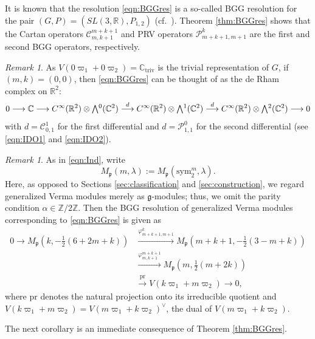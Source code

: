 \documentclass[reqno,11pt]{amsart}
\theoremstyle{remark}
\newtheorem{rem}[equation]{Remark}
\numberwithin{equation}{section}
\newcommand{\ga}{\alpha}
\newcommand{\fg}{{\mathfrak g}}
\newcommand{\fp}{{\mathfrak p}}
\newcommand{\R}{\mathbb{R}}
\newcommand{\C}{\mathbb{C}}
\newcommand{\Z}{\mathbb{Z}}
\newcommand{\Cal}{\mathcal}
\newcommand{\To}{\longrightarrow}
\newcommand{\triv}{\mathrm{triv}}
\newcommand{\sym}{\mathrm{sym}}
\newcommand{\pr}{\mathrm{pr}}
\newcommand{\Exterior}{\mathchoice{{\textstyle\bigwedge}}%
    {{\bigwedge}}%
    {{\textstyle\wedge}}%
    {{\scriptstyle\wedge}}}
\begin{document}
It is known that the resolution \eqref{eqn:BGGres} is a so-called
BGG resolution for the pair
$(G, P)= (SL(3,\R), P_{1,2})$ (cf.\  \cite{CD01, CSS01, EG11}).
Theorem \ref{thm:BGGres} shows that the Cartan operators
$\Cal{C}^{m+k+1}_{m,k+1}$ and PRV operators 
$\Cal{P}^{k}_{m+k+1,m+1}$ 
are the first and second BGG operators, respectively.

\begin{rem}
As $V(0\varpi_1 + 0\varpi_2)=\C_{\triv}$ is the trivial
representation of $G$, 
if $(m,k)=(0,0)$, then
\eqref{eqn:BGGres} can be thought of as
the de Rham complex on $\R^2$: 
\begin{equation*}%
0\To
\C
\To
C^\infty(\R^2) \otimes \Exterior^0(\C^2)
\stackrel{d}{\To}
C^\infty(\R^2)\otimes \Exterior^1(\C^2)
\stackrel{d}{\To}
C^\infty(\R^2)\otimes \Exterior^2(\C^2)
\To 0
\end{equation*}
with $d=\Cal{C}^{1}_{0,1}$ for the first differential 
and $d=\Cal{P}^{0}_{1,1}$ for the second differential 
(see \eqref{eqn:IDO1} and \eqref{eqn:IDO2}).
\end{rem}

\begin{rem}
As in \eqref{eqn:Ind}, write
\begin{equation*}
M_\fp(m,\lambda):=M_\fp(\sym^m_2,\lambda).
\end{equation*}
Here, as opposed to Sections \ref{sec:classification} and \ref{sec:construction}, 
we regard generalized Verma modules merely as $\fg$-modules; thus, we omit the 
parity condition $\ga \in \Z/2\Z$. Then the BGG resolution of generalized 
Verma modules corresponding to 
\eqref{eqn:BGGres} is given as 
\begin{equation}\label{eqn:BGGgeneral2}
\begin{aligned}
0
\To M_\fp(k, -\tfrac{1}{2}(6+2m+k))
&\stackrel{\varphi^{k}_{m+k+1,m+1}}{\To}
M_\fp(m+k+1, -\tfrac{1}{2}(3-m+k))\\[5pt]
&\stackrel{\varphi^{m+k+1}_{m,k+1}}{\To}
M_\fp(m, \tfrac{1}{2}(m+2k))\\[5pt]
&\stackrel{\pr}{\To}
V(k\varpi_1 + m\varpi_2)
\To 0,
\end{aligned}
\end{equation}
where $\pr$ denotes the natural projection onto its irreducible quotient
and $V(k\varpi_1 + m\varpi_2)= V(m\varpi_1+k\varpi_2)^\vee$,
the dual of $V(m\varpi_1+k\varpi_2)$.
\end{rem}

The next corollary is an immediate consequence of Theorem \ref{thm:BGGres}.
\end{document}
